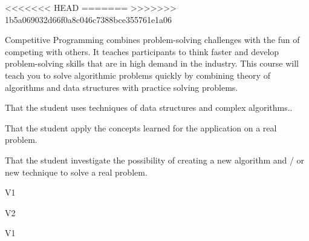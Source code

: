 \begin{syllabus}

<<<<<<< HEAD
=======
>>>>>>> 1b5a069032d66f0a8c046c7388bce355761e1a06

\begin{justification}
Competitive Programming combines problem-solving challenges with the fun of competing with others. It teaches participants to think faster and develop problem-solving skills that are in high demand in the industry.
This course will teach you to solve algorithmic problems quickly by combining theory of algorithms and data structures with practice solving problems.
\end{justification}

\begin{goals}
\item That the student uses techniques of data structures and complex algorithms..
\item That the student apply the concepts learned for the application on a real problem.
\item That the student investigate the possibility of creating a new algorithm and / or new technique to solve a real problem.
\end{goals}

\begin{outcomes}{V1}
    \item {}
    \item {}
    \item {}
\end{outcomes}

\begin{outcomes}{V2}
    \item {}
    \item {}
    \item {}
    \item {}
\end{outcomes}

\begin{competences}{V1}
    \item {}
    \item {}
    \item {}
\end{competences}


\end{syllabus}
